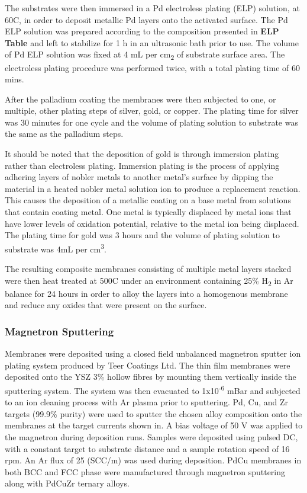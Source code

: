 The substrates were then immersed in a Pd electroless plating (ELP) solution, at 60\textdegree C, in order to deposit metallic Pd layers onto the activated surface. The Pd ELP solution was prepared according to the composition presented in \textbf{ELP Table} and left to stabilize for 1 h in an ultrasonic bath prior to use. The volume of Pd ELP solution was fixed at 4 mL per cm\textsubscript{2} of 
substrate surface area. The electroless plating procedure was performed twice, with a total plating time of 60 mins.

After the palladium coating the membranes were then subjected to one, or multiple, other plating steps of silver, gold, or copper. The plating time for silver was 30 minutes for one cycle and the volume of plating solution to substrate was the same as the palladium steps.

It should be noted that the deposition of gold is through immersion plating rather than electroless plating. Immersion plating is the process of applying adhering layers of nobler metals to another metal's surface by dipping the material in a heated nobler metal solution ion to produce a replacement reaction. This causes the deposition of a metallic coating on a base metal from solutions that contain coating metal. One metal is typically displaced by metal ions that have lower levels of oxidation potential, relative to the metal ion being displaced. The plating time for gold was 3 hours and the volume of plating solution to substrate was 4mL per cm\textsuperscript{3}.

The resulting composite membranes consisting of multiple metal layers stacked were then heat treated at 500\textdegree C under an environment containing 25\% H\textsubscript{2} in Ar balance for 24 hours in order to alloy the layers into a homogenous membrane and reduce any oxides that were present on the surface.

\subsubsection{Magnetron Sputtering}
Membranes were deposited using a closed field unbalanced magnetron sputter ion plating system produced by Teer Coatings Ltd. The thin film membranes were deposited onto the YSZ 3\% hollow fibres by mounting them vertically inside the sputtering system. The system was then evacuated to 1x10\textsuperscript{-6} mBar and subjected to an ion cleaning process with Ar plasma prior to sputtering. Pd, Cu, and Zr targets (99.9\% purity) were used to sputter the chosen alloy composition onto the membranes at the target currents shown in. A bias voltage of 50 V was applied to the magnetron during deposition runs. Samples were deposited using pulsed DC, with a constant target to substrate distance and a sample rotation speed of 16 rpm. An Ar flux of 25 (SCC/m) was used during deposition. PdCu membranes in both BCC and FCC phase were manufactured through magnetron sputtering along with PdCuZr ternary alloys. 

